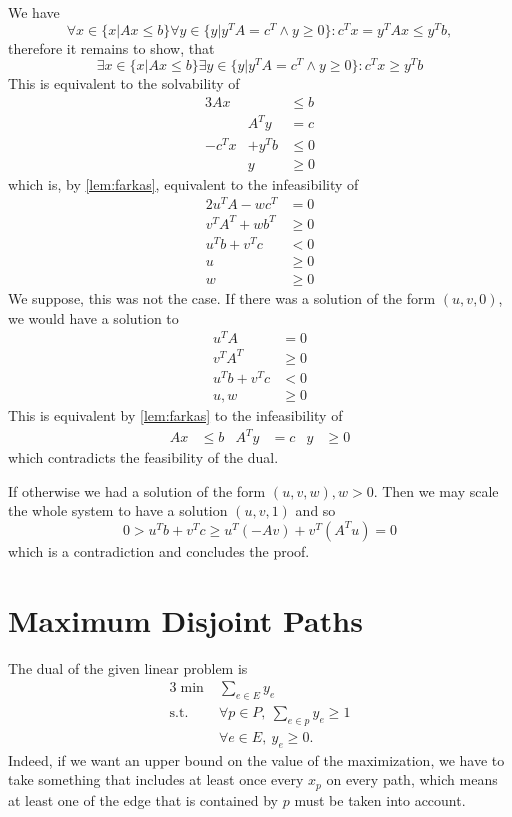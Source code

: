 \documentclass{scrartcl}
\newcommand\1{\mathbf{1}}
\begin{document}
\begin{Proof}
We have
\[
\forall x \in \{x|Ax\le b\} \forall y \in  \{y|y^TA = c^T \wedge y\ge 0\} \colon c^Tx =y^TAx \le y^Tb,
\]
therefore it remains to show, that 
\[
\exists x \in \{x|Ax\le b\} \exists y \in  \{y|y^TA = c^T \wedge y\ge 0\} \colon c^Tx\ge y^Tb
\]
This is equivalent to the solvability of
\begin{alignat*}{3}
A x&& \le b\\
&A^Ty &= c\\
-c^Tx &+ y^Tb &\le 0 \\
&y& \ge 0
\end{alignat*}
which is, by \autoref{lem:farkas}, equivalent to the infeasibility of
\begin{alignat*}{2}
u^TA - wc^T &= 0\\
 v^TA^T + wb^T &\ge 0\\
u^Tb+v^Tc &< 0 \\
 u &\ge 0\\
 w& \ge 0
 \end{alignat*}
We suppose, this was not the case. If there was a solution of the form $(u,v,0)$, we would have a solution to
\begin{align*}
u^TA &= 0\\
v^TA^T &\ge 0 \\
u^T b + v^T c& <0 \\
u, w &\ge 0
\end{align*}
This is equivalent by \autoref{lem:farkas} to the infeasibility of
\begin{align*}
Ax &\le b & A^Ty &= c &y&\ge 0
\end{align*}
which contradicts the feasibility of the dual.

If otherwise we had a solution of the form $(u,v,w), w >0$. Then we may scale the whole system to have a solution $(u,v,1)$ and so
\[
0 > u^T b + v^T c \ge u^T(-Av) + v^T (A^T u) = 0
\]
which is a contradiction and concludes the proof.
\end{Proof}

\section{Maximum Disjoint Paths}
The dual of the given linear problem is
\begin{alignat*}{3}
\min & \sum_{e \in E} y_e\\
\text{s.t.} & \forall p \in P, \ \sum_{e \in p} y_e \geq 1\\
& \forall e \in E, \  y_e \geq 0.
\end{alignat*}
Indeed, if we want an upper bound on the value of the maximization, we have to take something that includes at least once every $x_p$ on every path, which means at least one of the edge that is contained by $p$ must be taken into account. 
\end{document}
